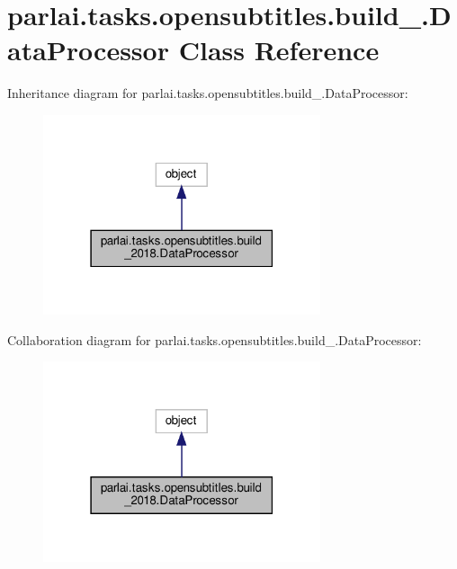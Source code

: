 \hypertarget{classparlai_1_1tasks_1_1opensubtitles_1_1build__2018_1_1DataProcessor}{}\section{parlai.\+tasks.\+opensubtitles.\+build\+\_.\+Data\+Processor Class Reference}
\label{classparlai_1_1tasks_1_1opensubtitles_1_1build__2018_1_1DataProcessor}


Inheritance diagram for parlai.\+tasks.\+opensubtitles.\+build\+\_.\+Data\+Processor\+:
\nopagebreak
\begin{figure}[H]
\begin{center}
\leavevmode
\includegraphics[width=231pt]{dc/db0/classparlai_1_1tasks_1_1opensubtitles_1_1build__2018_1_1DataProcessor__inherit__graph}
\end{center}
\end{figure}


Collaboration diagram for parlai.\+tasks.\+opensubtitles.\+build\+\_.\+Data\+Processor\+:
\nopagebreak
\begin{figure}[H]
\begin{center}
\leavevmode
\includegraphics[width=231pt]{d9/d76/classparlai_1_1tasks_1_1opensubtitles_1_1build__2018_1_1DataProcessor__coll__graph}
\end{center}
\end{figure}

